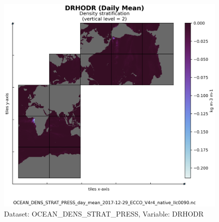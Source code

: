 \begin{figure}[H]
\centering
\includegraphics[scale=0.55]{../images/plots/native_plots/Ocean_Density_Stratification_and_Hydrostatic_Pressure/DRHODR.png}
\caption{Dataset: OCEAN\_DENS\_STRAT\_PRESS, Variable: DRHODR}
\label{tab:table-OCEAN_DENS_STRAT_PRESS_DRHODR-Plot}
\end{figure}
\newpage
\pagebreak
